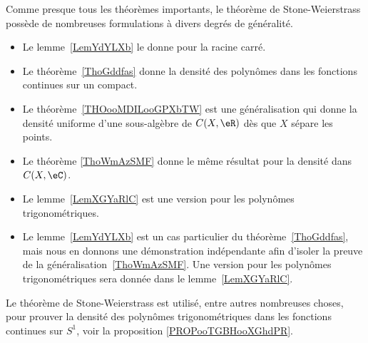 Comme presque tous les théorèmes importants, le théorème de Stone-Weierstrass possède de nombreuses formulations à divers degrés de généralité.
\begin{itemize}
	\item Le lemme~\ref{LemYdYLXb} le donne pour la racine carré.
	\item Le théorème~\ref{ThoGddfas} donne la densité des polynômes dans les fonctions continues sur un compact.
	\item Le théorème~\ref{THOooMDILooGPXbTW} est une généralisation qui donne la densité uniforme d'une sous-algèbre de \( C(X,\eR)\) dès que \( X\) sépare les points.
	\item Le théorème \ref{ThoWmAzSMF} donne le même résultat pour la densité dans \( C(X,\eC)\).
	\item Le lemme~\ref{LemXGYaRlC} est une version pour les polynômes trigonométriques.
	\item
	      Le lemme~\ref{LemYdYLXb} est un cas particulier du
	      théorème~\ref{ThoGddfas}, mais nous en donnons une démonstration indépendante afin d'isoler la preuve
	      de la généralisation~\ref{ThoWmAzSMF}.
	      Une version pour les polynômes trigonométriques sera donnée dans le lemme~\ref{LemXGYaRlC}.
\end{itemize}
Le théorème de Stone-Weierstrass est utilisé, entre autres nombreuses choses, pour prouver la densité des polynômes trigonométriques dans les fonctions continues sur \( S^1\), voir la proposition \ref{PROPooTGBHooXGhdPR}.
